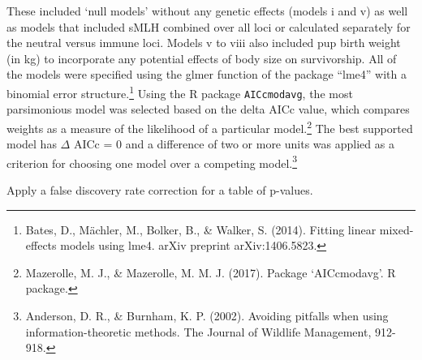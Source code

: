 \documentclass[]{article}
\newenvironment{Shaded}{\begin{snugshade}}{\end{snugshade}}
\newcommand{\KeywordTok}[1]{\textcolor[rgb]{0.13,0.29,0.53}{\textbf{#1}}}
\newcommand{\DataTypeTok}[1]{\textcolor[rgb]{0.13,0.29,0.53}{#1}}
\newcommand{\DecValTok}[1]{\textcolor[rgb]{0.00,0.00,0.81}{#1}}
\newcommand{\StringTok}[1]{\textcolor[rgb]{0.31,0.60,0.02}{#1}}
\newcommand{\CommentTok}[1]{\textcolor[rgb]{0.56,0.35,0.01}{\textit{#1}}}
\newcommand{\OperatorTok}[1]{\textcolor[rgb]{0.81,0.36,0.00}{\textbf{#1}}}
\newcommand{\NormalTok}[1]{#1}
\let\rmarkdownfootnote\footnote%
\def\footnote{\protect\rmarkdownfootnote}
\begin{document}
These included `null models' without any genetic effects (models i and
v) as well as models that included sMLH combined over all loci or
calculated separately for the neutral versus immune loci. Models v to
viii also included pup birth weight (in kg) to incorporate any potential
effects of body size on survivorship. All of the models were specified
using the glmer function of the package ``lme4'' with a binomial error
structure.\footnote{Bates, D., Mächler, M., Bolker, B., \& Walker, S.
  (2014). Fitting linear mixed-effects models using lme4. arXiv preprint
  arXiv:1406.5823.} Using the R package \texttt{AICcmodavg}, the most
parsimonious model was selected based on the delta AICc value, which
compares weights as a measure of the likelihood of a particular
model.\footnote{Mazerolle, M. J., \& Mazerolle, M. M. J. (2017). Package
  `AICcmodavg'. R package.} The best supported model has \(\Delta\) AICc
= 0 and a difference of two or more units was applied as a criterion for
choosing one model over a competing model.\footnote{Anderson, D. R., \&
  Burnham, K. P. (2002). Avoiding pitfalls when using
  information-theoretic methods. The Journal of Wildlife Management,
  912-918.}

Apply a false discovery rate correction for a table of p-values.

\begin{Shaded}
\end{Shaded}
\end{document}
